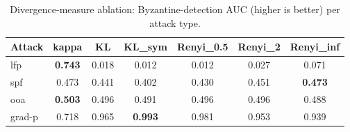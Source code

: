 \begin{table}[t]\centering\small
\caption{Divergence-measure ablation: Byzantine-detection AUC (higher is better) per attack type.}
\label{tab:divergence_ablation}
\begin{tabular}{lcccccc}
\toprule
Attack & kappa & KL & KL\_sym & Renyi\_0.5 & Renyi\_2 & Renyi\_inf \\
\midrule
lfp & \textbf{0.743} & 0.018 & 0.012 & 0.012 & 0.027 & 0.071 \\
spf & 0.473 & 0.441 & 0.402 & 0.430 & 0.451 & \textbf{0.473} \\
ooa & \textbf{0.503} & 0.496 & 0.491 & 0.496 & 0.496 & 0.488 \\
grad-p & 0.718 & 0.965 & \textbf{0.993} & 0.981 & 0.953 & 0.939 \\
\bottomrule
\end{tabular}
\end{table}
